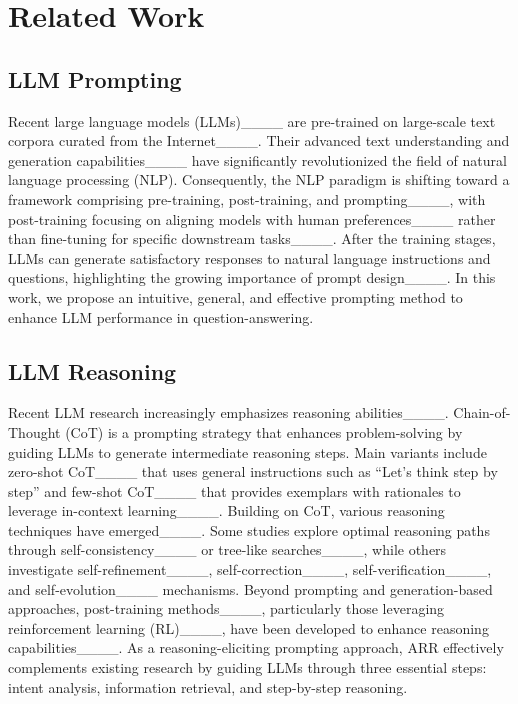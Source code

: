 \section{Related Work}
\label{sec:related_work}

\subsection{LLM Prompting}

Recent large language models (LLMs)____ are pre-trained on large-scale text corpora curated from the Internet____. %
Their advanced text understanding and generation capabilities____ have significantly revolutionized the field of natural language processing (NLP).
Consequently, the NLP paradigm is shifting toward a framework comprising pre-training, post-training, and prompting____, with post-training focusing on aligning models with human preferences____ rather than fine-tuning for specific downstream tasks____.
After the training stages, LLMs can generate satisfactory responses to natural language instructions and questions, highlighting the growing importance of prompt design____.
In this work, we propose an intuitive, general, and effective prompting method to enhance LLM performance in question-answering.

\subsection{LLM Reasoning}

Recent LLM research increasingly emphasizes reasoning abilities____.
Chain-of-Thought (CoT) is a prompting strategy that enhances problem-solving by guiding LLMs to generate intermediate reasoning steps.
Main variants include zero-shot CoT____ that uses general instructions such as ``Let's think step by step'' and few-shot CoT____ that provides exemplars with rationales to leverage in-context learning____.
Building on CoT, various reasoning techniques have emerged____.
Some studies explore optimal reasoning paths through self-consistency____ or tree-like searches____,
while others investigate self-refinement____, self-correction____, self-verification____, and self-evolution____ mechanisms.
Beyond prompting and generation-based approaches, post-training methods____, particularly those leveraging reinforcement learning (RL)____, have been developed to enhance reasoning capabilities____.
As a reasoning-eliciting prompting approach, ARR effectively complements existing research by guiding LLMs through three essential steps: intent analysis, information retrieval, and step-by-step reasoning.


